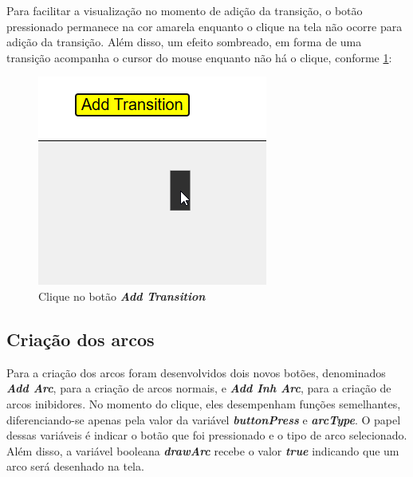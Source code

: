 \documentclass[
	12pt,				%
	openright,			%
	oneside,			%
	a4paper,			%
	english,			%
	brazil				%
	]{abntex2}
\theoremstyle{doispontos}
\begin{document}
Para facilitar a visualização no momento de adição da transição, o botão pressionado permanece na cor amarela enquanto o clique na tela não ocorre para adição da transição. Além disso, um efeito sombreado, em forma de uma transição acompanha o cursor do mouse enquanto não há o clique, conforme \ref{fig:clique_add_transition}: 

\begin{figure}[ht] 
	\centering
	\includegraphics[scale=0.55]{figuras/exemplo_clique_addTransition.png}
	\caption[Clicando bo botao addTransition]{Clique no botão \textit{\textbf{Add Transition}}}
	\label{fig:clique_add_transition}
\end{figure}

\subsection{Criação dos arcos}

Para a criação dos arcos foram desenvolvidos dois novos botões, denominados \textbf{\textit{Add Arc}}, para a criação de arcos normais, e \textbf{\textit{Add Inh Arc}}, para a criação de arcos inibidores. No momento do clique, eles desempenham funções semelhantes, diferenciando-se apenas pela valor da variável \textit{\textbf{buttonPress}} e \textbf{\textit{arcType}}. O papel dessas variáveis é indicar o botão que foi pressionado e o tipo de arco selecionado. Além disso, a variável booleana \textbf{\textit{drawArc}} recebe o valor \textbf{\textit{true}} indicando que um arco será desenhado na tela.




\end{document}
